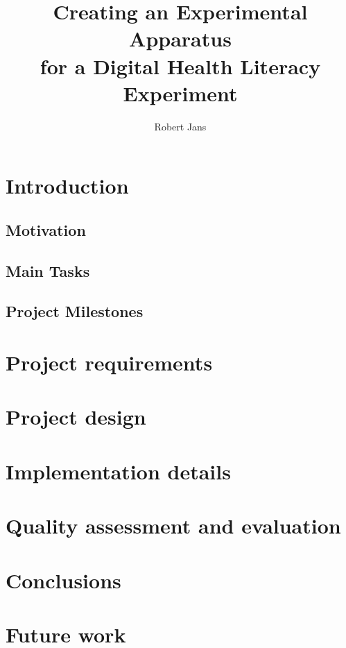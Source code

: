\documentclass[]{usiinfbachelorproject}
\author{Robert Jans}
\title{Creating an Experimental Apparatus \\ for a Digital Health Literacy Experiment}
\begin{document}
\maketitle

\section{Introduction} \label{introduction}

\subsection{Motivation}
\TODO{}

\subsection{Main Tasks}
\TODO{}

\subsection{Project Milestones}
\TODO{}

\section{Project requirements} \label{requirements}

\TODO{}

\section{Project design} \label{design}

\TODO{}

\section{Implementation details} \label{implementation}

\TODO{}


\section{Quality assessment and evaluation} \label{evaluation}

\TODO{}

\section{Conclusions} \label{conclusions}

\TODO{}

\section{Future work} \label{futureWork}

\TODO{}



\newpage



\end{document}
